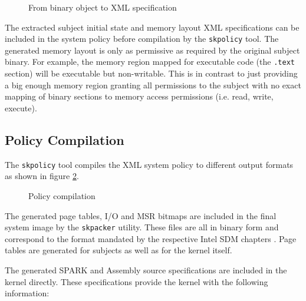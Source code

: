 \begin{figure}[h]
	\centering
	
	\caption{From binary object to XML specification}
	\label{fig:object-analysis}
\end{figure}

The extracted subject initial state and memory layout XML specifications can be
included in the system policy before compilation by the \texttt{skpolicy} tool.
The generated memory layout is only as permissive as required by the original
subject binary. For example, the memory region mapped for executable code
(the \texttt{.text} section) will be executable but non-writable. This is in
contrast to just providing a big enough memory region granting all permissions
to the subject with no exact mapping of binary sections to memory access
permissions (i.e. read, write, execute).

\subsection{Policy Compilation}\label{subsec:policy-compilation}
The \texttt{skpolicy} tool compiles the XML system policy to different output
formats as shown in figure \ref{fig:policy-compilation}.

\begin{figure}[h]
	\centering
	
	\caption{Policy compilation}
	\label{fig:policy-compilation}
\end{figure}

The generated page tables, I/O and MSR bitmaps are included in the final system
image by the \texttt{skpacker} utility. These files are all in binary form and
correspond to the format mandated by the respective Intel SDM chapters
\cite{IntelSDM}. Page tables are generated for subjects as well as for the
kernel itself.

The generated SPARK and Assembly source specifications are included in the
kernel directly. These specifications provide the kernel with the following
information:

